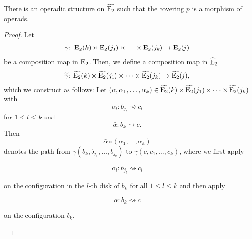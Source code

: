\begin{prop}
    There is an operadic structure on $\widetilde{\operatorname{E}_2}$ such that the covering
    $p$ is a morphism of operads.
\end{prop}

\begin{proof}
    Let 
    \[
        \gamma \colon \operatorname{E}_2(k) \times \operatorname{E}_2(j_1) \times \dots \times 
        \operatorname{E}_2(j_k) \to \operatorname{E}_2(j)
    \]
    be a composition map in $\operatorname{E}_2$. Then, we define a composition map in
    $\widetilde{\operatorname{E}_2}$
    \begin{align*}
        \widetilde{\gamma} \colon \widetilde{\operatorname{E}_2}(k) \times \widetilde{\operatorname{E}_2}(j_1) \times \dots \times 
        \widetilde{\operatorname{E}_2}(j_k) &\to \widetilde{\operatorname{E}_2}(j), \\
    \end{align*}
    which we construct as follows: Let $(\bar{\alpha}, \alpha_1, \dots,
    \alpha_k) \in \widetilde{\operatorname{E}_2}(k) \times \widetilde{\operatorname{E}_2}(j_1) \times \dots
    \times \widetilde{\operatorname{E}_2}(j_k)$ with
        $$\alpha_l \colon b_{j_l} \rightsquigarrow c_l$$ for $1 \leq l \leq k$
    and 
        $$\bar{\alpha} \colon b_k \rightsquigarrow c.$$ Then 
        \[
            \bar{\alpha} \circ (\alpha_1, \dots, \alpha_k)    
        \]
    denotes the path from $\gamma(b_k, b_{j_1}, \dots, b_{j_k})$ to $\gamma(c,
    c_1, \dots, c_k)$, where we first apply

    $$\alpha_l \colon b_{j_l} \rightsquigarrow c_l$$

    on the configuration in the $l$-th disk of $b_k$ for all $1 \leq l \leq k$
    and then apply 

    $$\bar{\alpha} \colon b_k \rightsquigarrow c$$

    on the configuration $b_k$.
    \begin{figure}[h!]\label{fig:movedisks}
        
\end{figure}
\end{proof}
